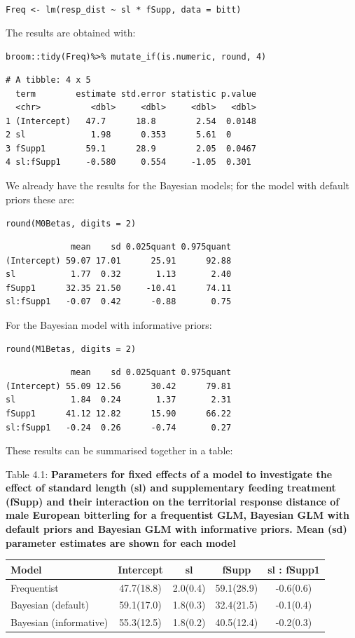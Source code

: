 \documentclass[
]{book}
\begin{document}
\texttt{Freq\ \textless{}-\ lm(resp\_dist\ \textasciitilde{}\ sl\ *\ fSupp,\ data\ =\ bitt)}

The results are obtained with:

\texttt{broom::tidy(Freq)\%\textgreater{}\%\ mutate\_if(is.numeric,\ round,\ 4)}

\begin{verbatim}
# A tibble: 4 x 5
  term        estimate std.error statistic p.value
  <chr>          <dbl>     <dbl>     <dbl>   <dbl>
1 (Intercept)   47.7      18.8        2.54  0.0148
2 sl             1.98      0.353      5.61  0     
3 fSupp1        59.1      28.9        2.05  0.0467
4 sl:fSupp1     -0.580     0.554     -1.05  0.301 
\end{verbatim}

We already have the results for the Bayesian models; for the model with default priors these are:

\texttt{round(M0Betas,\ digits\ =\ 2)}

\begin{verbatim}
             mean    sd 0.025quant 0.975quant
(Intercept) 59.07 17.01      25.91      92.88
sl           1.77  0.32       1.13       2.40
fSupp1      32.35 21.50     -10.41      74.11
sl:fSupp1   -0.07  0.42      -0.88       0.75
\end{verbatim}

For the Bayesian model with informative priors:

\texttt{round(M1Betas,\ digits\ =\ 2)}

\begin{verbatim}
             mean    sd 0.025quant 0.975quant
(Intercept) 55.09 12.56      30.42      79.81
sl           1.84  0.24       1.37       2.31
fSupp1      41.12 12.82      15.90      66.22
sl:fSupp1   -0.24  0.26      -0.74       0.27
\end{verbatim}

These results can be summarised together in a table:

Table 4.1: \textbf{Parameters for fixed effects of a model to investigate the effect of standard length (sl) and supplementary feeding treatment (fSupp) and their interaction on the territorial response distance of male European bitterling for a frequentist GLM, Bayesian GLM with default priors and Bayesian GLM with informative priors. Mean (sd) parameter estimates are shown for each model}

\begin{longtable}[]{@{}lcccc@{}}
\toprule
Model & Intercept & sl & fSupp & sl : fSupp1 \\
\midrule
\endhead
Frequentist & 47.7(18.8) & 2.0(0.4) & 59.1(28.9) & -0.6(0.6) \\
Bayesian (default) & 59.1(17.0) & 1.8(0.3) & 32.4(21.5) & -0.1(0.4) \\
Bayesian (informative) & 55.3(12.5) & 1.8(0.2) & 40.5(12.4) & -0.2(0.3) \\
\bottomrule
\end{longtable}
\end{document}
